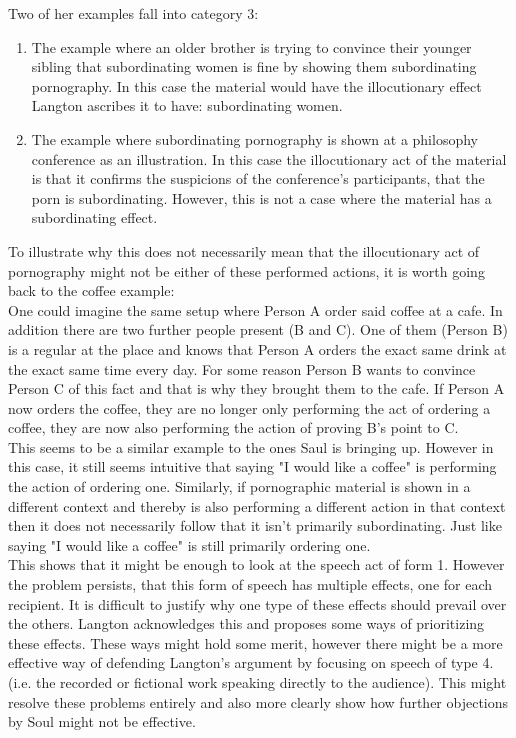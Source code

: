 \documentclass[14pt]{article}
\begin{document}
Two of her examples fall into category 3:
\begin{enumerate}
  \item The example where an older brother is trying to convince their younger sibling that subordinating women is fine by showing them subordinating pornography. In this
  case the material would have the illocutionary effect Langton ascribes it to have: subordinating women.
  \item The example where subordinating pornography is shown at a philosophy conference as an illustration. In this case the illocutionary act of the material is
  that it confirms the suspicions of the conference's participants, that the porn is subordinating. However, this is not a case where the material has a
  subordinating effect.
\end{enumerate}

To illustrate why this does not necessarily mean that the illocutionary act of pornography might not be either of these performed actions,
it is worth going back to the coffee example:
\\
One could imagine the same setup where Person A order said coffee at a cafe. In addition there are two further people present (B and C). One of them (Person B)
is a regular at the place 
and knows that Person A orders the exact same drink at the exact same time every day. For some reason Person B wants to convince Person C of this fact and that is why they brought them
to the cafe. If Person A now orders the coffee, they are no longer only performing the act of ordering a coffee, they are now also performing the action of proving B's point
to C. \\
This seems to be a similar example to the ones Saul is bringing up. However in this case, it still seems intuitive that saying "I would like a coffee" is
performing the action of ordering one. Similarly, if pornographic material is shown in a different context and thereby is also performing a different action
in that context then it does not necessarily follow that it isn't primarily subordinating. Just like saying "I would like a coffee" is still primarily ordering one.\\

This shows that it might be enough to look at the speech act of form 1. However the problem persists, that this form of speech has
multiple effects, one for each recipient.
It is difficult to justify why one type of these effects should prevail over the others. Langton acknowledges this and proposes some ways of prioritizing these
effects\autocite[p. 311]{Langton}. These ways might hold some merit, however there might be a more effective way of defending Langton's 
argument by focusing on speech of type 4. (i.e. the recorded or fictional work speaking directly to the audience).
This might resolve these problems entirely and also more clearly show how further objections by Soul might not be effective. \\
\end{document}
